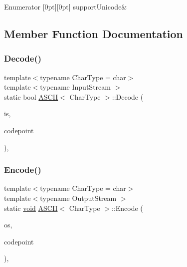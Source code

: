\begin{DoxyEnumFields}{Enumerator}
[0pt][0pt]{}\mbox{\label{structASCII_a59193e2783f1ec8e2c4c99a265c5c856a672ec36bd3404c3050a9111a934cbe00}} 
support\+Unicode&\\
\hline

\end{DoxyEnumFields}


\subsection{Member Function Documentation}
\mbox{\label{structASCII_a44844bbfd0a4fc282993fd72f3f58eee}} 
\subsubsection{\texorpdfstring{Decode()}{Decode()}}
{\footnotesize\ttfamily template$<$typename Char\+Type  = char$>$ \\
template$<$typename Input\+Stream $>$ \\
static bool \hyperlink{structASCII}{A\+S\+C\+II}$<$ Char\+Type $>$\+::Decode (\begin{DoxyParamCaption}\item[{Input\+Stream \&}]{is,  }\item[{unsigned $\ast$}]{codepoint }\end{DoxyParamCaption})\hspace{0.3cm}{\ttfamily [inline]}, {\ttfamily [static]}}

\mbox{\label{structASCII_af56b1605fe233c54693facc7de457f72}} 
\subsubsection{\texorpdfstring{Encode()}{Encode()}}
{\footnotesize\ttfamily template$<$typename Char\+Type  = char$>$ \\
template$<$typename Output\+Stream $>$ \\
static \hyperlink{imgui__impl__opengl3__loader_8h_ac668e7cffd9e2e9cfee428b9b2f34fa7}{void} \hyperlink{structASCII}{A\+S\+C\+II}$<$ Char\+Type $>$\+::Encode (\begin{DoxyParamCaption}\item[{Output\+Stream \&}]{os,  }\item[{unsigned}]{codepoint }\end{DoxyParamCaption})\hspace{0.3cm}{\ttfamily [inline]}, {\ttfamily [static]}}

